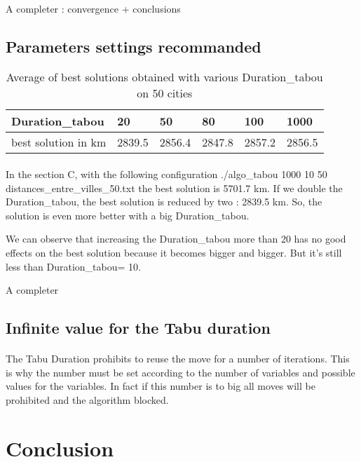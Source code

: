 \documentclass[12pt,oneside,a4paper]{article}
\begin{document}
\paragraph{}
A completer : convergence + conclusions

\newpage
\subsection{Parameters settings recommanded}
\begin{table}[h]
    \centering
    \small
    \begin{tabular}{llllll}
      \hline
      \multicolumn{1}{|l|}{\textbf{Duration\_tabou}}& \multicolumn{1}{l|}{\textbf{20}} & \multicolumn{1}{l|}{\textbf{50}} & \multicolumn{1}{l|}{\textbf{80}} & \multicolumn{1}{l|}{\textbf{100}} & \multicolumn{1}{l|}{\textbf{1000}}\\ \hline
      \multicolumn{1}{|l|}{best solution in km } & \multicolumn{1}{l|}{2839.5}  & \multicolumn{1}{l|}{2856.4}  & \multicolumn{1}{l|}{2847.8}   & \multicolumn{1}{l|}{2857.2}  & \multicolumn{1}{l|}{2856.5} \\ \hline
    \end{tabular}
    \caption{Average of best solutions obtained with various Duration\_tabou on 50 cities}
  \end{table}
\paragraph{}
    In the section C, with the following configuration ./algo\_tabou  1000 10 50 distances\_entre\_villes\_50.txt the best solution is 5701.7 km. 
    If we double the Duration\_tabou, the best solution is reduced by two :  2839.5 km.
    So, the solution is even more better with a big Duration\_tabou. 

    We can observe that increasing the Duration\_tabou more than 20 has no good effects on the best solution because it becomes bigger and bigger. 
    But it’s still less than Duration\_tabou= 10. 

    A completer

\subsection{Infinite value for the Tabu duration}
\paragraph{}
  The Tabu Duration prohibits to reuse the move for a number of iterations. This is why the number must be set according to the number of variables 
  and possible values for the variables. In fact if this number is to big all moves will be prohibited and the algorithm blocked.
\section{Conclusion}
\paragraph{}
\end{document}
